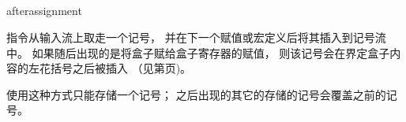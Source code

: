 \documentclass{book}
\begin{document}
\subsection{\protect{}}
\label{sec:afterassignment}

\csterm afterassignment\par 指令从输入流上取走一个记号，
并在下一个赋值或宏定义后将其插入到记号流中。
如果随后出现的是将盒子赋给盒子寄存器的赋值，
则该记号会在界定盒子内容的左花括号之后被插入
（见第\pageref{every:box:assign}页)。

使用这种方式只能存储一个记号；
之后出现的其它的存储的记号会覆盖之前的记号。
\end{document}
